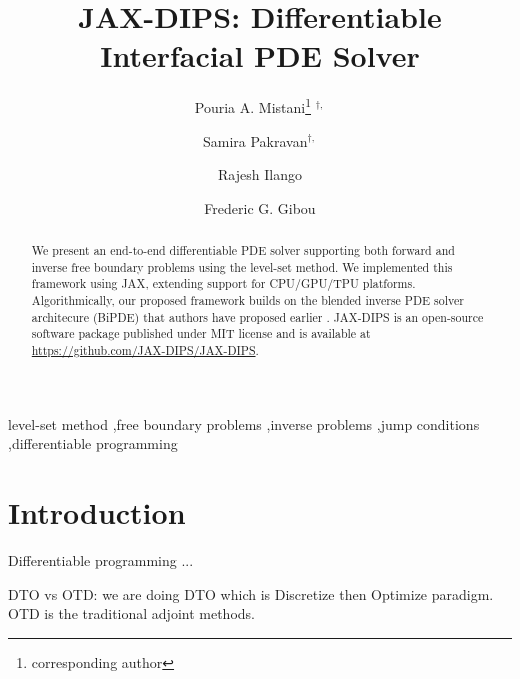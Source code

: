 \documentclass{elsarticle}
\begin{document}
\title{JAX-DIPS: Differentiable Interfacial PDE Solver}



\author[1]{Pouria A. Mistani\thanks{corresponding author} $^{\dagger,}$}
\author[2]{Samira Pakravan$^{\dagger,}$}
\author[1]{Rajesh Ilango}
\author[2]{Frederic G. Gibou}

\address[1]{NVIDIA Corporation, Santa Clara, CA 95051, USA}
\address[2]{University of California, Santa Barbara, CA 93106-5070, USA}

\begin{abstract}
We present an end-to-end differentiable PDE solver supporting both forward and inverse free boundary problems using the level-set method. We implemented this framework using JAX, extending support for CPU/GPU/TPU platforms. Algorithmically, our proposed framework builds on the blended inverse PDE solver architecure (BiPDE) that authors have proposed earlier \cite{pakravan2021solving}. JAX-DIPS is an open-source software package published under MIT license and is available at \href{https://github.com/JAX-DIPS/JAX-DIPS}{https://github.com/JAX-DIPS/JAX-DIPS}.

\end{abstract}

\begin{keyword}
level-set method \sep free boundary problems \sep inverse problems \sep jump conditions \sep differentiable programming 
\end{keyword}

\maketitle
\def\thefootnote{$\dagger$}







\section{Introduction}
\label{sec::introduction}
Differentiable programming ...

DTO vs OTD: we are doing DTO which is Discretize then Optimize paradigm. OTD is the traditional adjoint methods.
\end{document}
